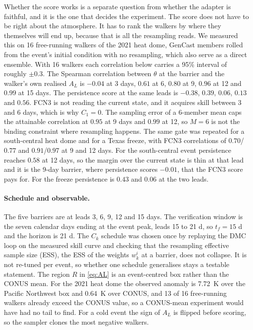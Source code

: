 \documentclass[10pt,twocolumn]{article}
\newcommand{\AL}{A_L}
\newcommand{\ck}{C_k}
\begin{document}
Whether the score works is a separate question from whether the adapter is faithful, and it is the one that decides the experiment. The score does not have to be right about the atmosphere. It has to rank the walkers by where they themselves will end up, because that is all the resampling reads. We measured this on 16 free-running walkers of the 2021 heat dome, GenCast members rolled from the event's initial condition with no resampling, which also serve as a direct ensemble. With 16 walkers each correlation below carries a 95\% interval of roughly $\pm 0.3$. The Spearman correlation between $\theta$ at the barrier and the walker's own realised $\AL$ is $-0.04$ at 3 days, $0.61$ at 6, $0.80$ at 9, $0.96$ at 12 and $0.99$ at 15 days. The persistence score at the same leads is $-0.38$, $0.39$, $0.06$, $0.13$ and $0.56$. FCN3 is not reading the current state, and it acquires skill between 3 and 6 days, which is why $C_1 = 0$. The sampling error of a 6-member mean caps the attainable correlation at $0.95$ at 9 days and $0.99$ at 12, so $M = 6$ is not the binding constraint where resampling happens. The same gate was repeated for a south-central heat dome and for a Texas freeze, with FCN3 correlations of $0.70$/$0.77$ and $0.91$/$0.97$ at 9 and 12 days. For the south-central event persistence reaches $0.58$ at 12 days, so the margin over the current state is thin at that lead and it is the 9-day barrier, where persistence scores $-0.01$, that the FCN3 score pays for. For the freeze persistence is $0.43$ and $0.06$ at the two leads.

\paragraph{Schedule and observable.}
The five barriers are at leads 3, 6, 9, 12 and 15 days. The verification window is the seven calendar days ending at the event peak, leads 15 to 21 d, so $t_f = 15$ d and the horizon is 21 d. The $\ck$ schedule was chosen once by replaying the DMC loop on the measured skill curve and checking that the resampling effective sample size (ESS), the ESS of the weights $w^i_k$ at a barrier, does not collapse. It is not re-tuned per event, so whether one schedule generalises stays a testable statement. The region $R$ in \cref{eq:AL} is an event-centred box rather than the CONUS mean. For the 2021 heat dome the observed anomaly is \SI{+7.72}{K} over the Pacific Northwest box and \SI{+0.64}{K} over CONUS, and 13 of 16 free-running walkers already exceed the CONUS value, so a CONUS-mean experiment would have had no tail to find. For a cold event the sign of $\AL$ is flipped before scoring, so the sampler clones the most negative walkers.
\end{document}
